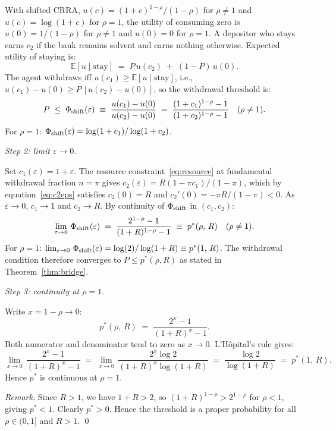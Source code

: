 \documentclass[12pt]{article}\usepackage[]{graphicx}\usepackage[]{xcolor}
\begin{document}
With shifted CRRA, $u(c) = (1+c)^{1-\rho}/(1-\rho)$ for $\rho \neq 1$ and $u(c) = \log(1+c)$ for $\rho = 1$, the utility of consuming zero is $u(0) = 1/(1-\rho)$ for $\rho \neq 1$ and $u(0) = 0$ for $\rho = 1$.
A depositor who stays earns $c_2$ if the bank remains solvent and earns nothing otherwise.
Expected utility of staying is: \[ \mathbb{E}[u \mid \text{stay}] \;=\; P\,u(c_2) \;+\; (1-P)\,u(0). \] The agent withdraws iff $u(c_1) \geq \mathbb{E}[u \mid \text{stay}]$, i.e., $u(c_1) - u(0) \geq P\,[u(c_2) - u(0)]$, so the withdrawal threshold is:
\begin{equation}
  P \;\leq\; \Phi_{\rm shift}(\varepsilon)
  \;\equiv\;
  \frac{u(c_1) - u(0)}{u(c_2) - u(0)}
  \;=\;
  \frac{(1+c_1)^{1-\rho} - 1}{(1+c_2)^{1-\rho} - 1}
  \quad (\rho \neq 1).
  \label{eq:phishift}
\end{equation}
For $\rho = 1$: $\Phi_{\rm shift}(\varepsilon) = \log(1+c_1)/\log(1+c_2)$.

\medskip

\noindent\textit{Step 2: limit $\varepsilon \to 0$.}

Set $c_1(\varepsilon) = 1 + \varepsilon$.
The resource constraint~\eqref{eq:resource} at fundamental withdrawal fraction $n = \pi$ gives $c_2(\varepsilon) = R(1 - \pi c_1)/(1-\pi)$, which by equation~\eqref{eq:c2eps} satisfies $c_2(0) = R$ and $c_2'(0) = -\pi R/(1-\pi) < 0$.
As $\varepsilon \to 0$, $c_1 \to 1$ and $c_2 \to R$.
By continuity of $\Phi_{\rm shift}$ in $(c_1, c_2)$: \[ \lim_{\varepsilon \to 0}\,\Phi_{\rm shift}(\varepsilon) \;=\; \frac{2^{1-\rho} - 1}{(1+R)^{1-\rho} - 1} \;\equiv\; p^*(\rho,\, R) \quad (\rho \neq 1). \] For $\rho = 1$: $\lim_{\varepsilon \to 0}\,\Phi_{\rm shift}(\varepsilon) = \log(2)/\log(1+R) \equiv p^*(1,\,R)$.
The withdrawal condition therefore converges to $P \leq p^*(\rho,R)$ as stated in Theorem~\ref{thm:bridge}.

\medskip

\noindent\textit{Step 3: continuity at $\rho = 1$.}

Write $x = 1 - \rho \to 0$: \[ p^*(\rho,\,R) \;=\; \frac{2^x - 1}{(1+R)^x - 1}. \] Both numerator and denominator tend to zero as $x \to 0$.
L'H\^opital's rule gives: \[ \lim_{x \to 0}\,\frac{2^x - 1}{(1+R)^x - 1} \;=\; \lim_{x \to 0}\,\frac{2^x \log 2}{(1+R)^x \log(1+R)} \;=\; \frac{\log 2}{\log(1+R)} \;=\; p^*(1,\,R). \] Hence $p^*$ is continuous at $\rho = 1$.

\medskip

\noindent\textit{Remark.}
Since $R > 1$, we have $1 + R > 2$, so $(1+R)^{1-\rho} > 2^{1-\rho}$ for $\rho < 1$, giving $p^* < 1$.
Clearly $p^* > 0$.
Hence the threshold is a proper probability for all $\rho \in (0,1]$ and $R > 1$.
\qed
\end{document}
